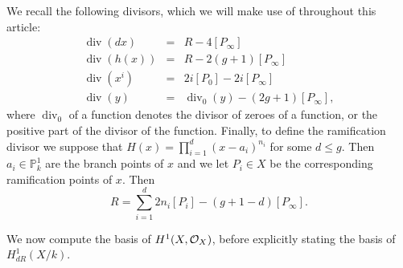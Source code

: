 \documentclass[draft, 11pt]{article} %
\theoremstyle{plain}
\theoremstyle{remark}
\newcommand{\cO}{{\cal O}}
\DeclareMathOperator{\di}{div}
\begin{document}
We recall the following divisors, which we will make use of throughout this article:
\begin{eqnarray*}
\di (dx) & = & R - 4[P_\infty] \\
\di (h(x)) & = & R - 2(g+1)[P_\infty] \\
\di (x^i) & = & 2i[P_0] - 2i[P_\infty]\\
\di (y) & = & \di_0(y) - (2g+1)[P_\infty],
\end{eqnarray*}
where $\di_0$ of a function denotes the divisor of zeroes of a function, or the positive part of the divisor of the function.
Finally, to define the ramification divisor we suppose that $H(x) = \prod_{i=1}^d (x-a_i)^{n_i}$ for some $d \leq g$.
Then $a_i \in \mathbb P_k^1$ are the branch points of $x$ and we let $P_i \in X$ be the corresponding ramification points of $x$.
Then
\[
R = \sum_{i=1}^d 2n_i[P_i] - (g+1-d)[P_\infty].
\]

We now compute the basis of $H^1(X,\cO_X)$, before explicitly stating the basis of $H^1_{dR}(X/k)$.\\
\end{document}
